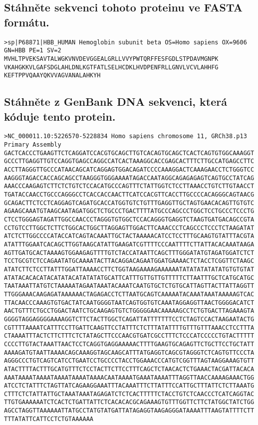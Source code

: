 \documentclass[11pt]{article}
\begin{document}
\subsection{Stáhněte sekvenci tohoto proteinu ve FASTA formátu.}
\label{sec:org8859936}
\begin{verbatim}
>sp|P68871|HBB_HUMAN Hemoglobin subunit beta OS=Homo sapiens OX=9606 GN=HBB PE=1 SV=2
MVHLTPVEKSAVTALWGKVNVDEVGGEALGRLLVVYPWTQRFFESFGDLSTPDAVMGNPK
VKAHGKKVLGAFSDGLAHLDNLKGTFATLSELHCDKLHVDPENFRLLGNVLVCVLAHHFG
KEFTPPVQAAYQKVVAGVANALAHKYH
\end{verbatim}
\subsection{Stáhněte z GenBank DNA sekvenci, která kóduje tento protein.}
\label{sec:org7e212a3}
\begin{verbatim}
>NC_000011.10:5226570-5228834 Homo sapiens chromosome 11, GRCh38.p13 Primary Assembly
GACTCACCCTGAAGTTCTCAGGATCCACGTGCAGCTTGTCACAGTGCAGCTCACTCAGTGTGGCAAAGGT
GCCCTTGAGGTTGTCCAGGTGAGCCAGGCCATCACTAAAGGCACCGAGCACTTTCTTGCCATGAGCCTTC
ACCTTAGGGTTGCCCATAACAGCATCAGGAGTGGACAGATCCCCAAAGGACTCAAAGAACCTCTGGGTCC
AAGGGTAGACCACCAGCAGCCTAAGGGTGGGAAAATAGACCAATAGGCAGAGAGAGTCAGTGCCTATCAG
AAACCCAAGAGTCTTCTCTGTCTCCACATGCCCAGTTTCTATTGGTCTCCTTAAACCTGTCTTGTAACCT
TGATACCAACCTGCCCAGGGCCTCACCACCAACTTCATCCACGTTCACCTTGCCCCACAGGGCAGTAACG
GCAGACTTCTCCTCAGGAGTCAGATGCACCATGGTGTCTGTTTGAGGTTGCTAGTGAACACAGTTGTGTC
AGAAGCAAATGTAAGCAATAGATGGCTCTGCCCTGACTTTTATGCCCAGCCCTGGCTCCTGCCCTCCCTG
CTCCTGGGAGTAGATTGGCCAACCCTAGGGTGTGGCTCCACAGGGTGAGGTCTAAGTGATGACAGCCGTA
CCTGTCCTTGGCTCTTCTGGCACTGGCTTAGGAGTTGGACTTCAAACCCTCAGCCCTCCCTCTAAGATAT
ATCTCTTGGCCCCATACCATCAGTACAAATTGCTACTAAAAACATCCTCCTTTGCAAGTGTATTTACGTA
ATATTTGGAATCACAGCTTGGTAAGCATATTGAAGATCGTTTTCCCAATTTTCTTATTACACAAATAAGA
AGTTGATGCACTAAAAGTGGAAGAGTTTTGTCTACCATAATTCAGCTTTGGGATATGTAGATGGATCTCT
TCCTGCGTCTCCAGAATATGCAAAATACTTACAGGACAGAATGGATGAAAACTCTACCTCGGTTCTAAGC
ATATCTTCTCCTTATTTGGATTAAAACCTTCTGGTAAGAAAAGAAAAAATATATATATATATGTGTGTAT
ATATACACACATACATATACATATATATGCATTCATTTGTTGTTGTTTTTCTTAATTTGCTCATGCATGC
TAATAAATTATGTCTAAAAATAGAATAAATACAAATCAATGTGCTCTGTGCATTAGTTACTTATTAGGTT
TTGGGAAACAAGAGATAAAAAACTAGAGACCTCTTAATGCAGTCAAAAATACAAATAAATAAAAAGTCAC
TTACAACCCAAAGTGTGACTATCAATGGGGTAATCAGTGGTGTCAAATAGGAGGTTAACTGGGGACATCT
AACTGTTTCTGCCTGGACTAATCTGCAAGAGTGTCTGGGGGAACAAAAAGCCTCTGTGACTTAGAAAGTA
GGGGTAGGAGGGGAAAAGGTCTTCTACTTGGCTCAGATTATTTTTTTCCTCTAGTCCACTAAGAATACTG
CGTTTTAAAATCATTTCCTTGATTCAAGTTCCTATTTCTCTTTATATTTTGTTTGTTTAAACCTCCTTTA
CTAAAATTTACTCTTCTTTCTCTATAGCTTCCCAACGTGATCGCCTTTCTCCCATCCCCCTGTACTTTTT
CCCCTTGTACTAAATTAACTCCTCAGGTGAGGAAAAACTTTTGAAGTGCAGAGTTCTGCTTCCTGCTATT
AAAAGATGTAATTAAAACAGCAAAGGTAGCAAGCATTTATGAGGTCAGCGTAGGGTCTCAGTGTTCCCTA
AGGGCCCTGTCAGTCATCCTGAATCCTGCCCCTACCTGGAAACCCATGTCGGTTTAGTAAGGAAAGTGTT
ATACTTTTACTTTGCATGTTTCTCCTACTTCTTCCTTTCAGCTCTAACACTCTGAAACTACGATTACACA
AAATAAAATAAAATAAAATAAAATAAAACAATAAAATGAAATAAAATTTAGGTTAACCAAAAGAAACTGG
ATCCTCTATTTCTAGTTATCAGAAGGAAATTTACAAATTTCTTATTTCCATTGCTTTATTCTCTTAAATG
CTTTCTCTATTATTGCTAAATAAATAGAGATCTCTCACTTTTTCTACCTGTCTCAACCCTCATCAGGTAC
TTGTGAAAAAATCTCACTCTGATTATTCTCACACACGCAGAAAGTGTTTGGTTCTTCTATGGCTATCTGG
AGCCTAGGTTAAAAAATTATGCCTATGTATGATTATAGAGGTAAGAGGGATAAAATTTAAGTATTTTCTT
TTTATATTCATTCCTCTGTAAAAAA
\end{verbatim}
\end{document}

